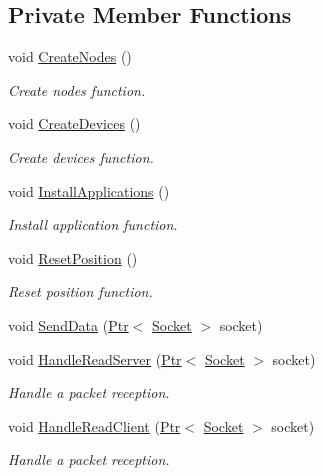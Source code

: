 \subsection*{Private Member Functions}
\begin{DoxyCompactItemize}
\item 
void \hyperlink{classHwmpReactiveRegressionTest_a8fc99893263e4df5158da499f1209832}{Create\+Nodes} ()
\begin{DoxyCompactList}\small\item\em Create nodes function. \end{DoxyCompactList}\item 
void \hyperlink{classHwmpReactiveRegressionTest_a8b288a6801baae1e65f87de7eb0352a4}{Create\+Devices} ()
\begin{DoxyCompactList}\small\item\em Create devices function. \end{DoxyCompactList}\item 
void \hyperlink{classHwmpReactiveRegressionTest_aff40d00524e84993b9cd2f391ae33a55}{Install\+Applications} ()
\begin{DoxyCompactList}\small\item\em Install application function. \end{DoxyCompactList}\item 
void \hyperlink{classHwmpReactiveRegressionTest_a4e90c3bf3be7eaf73a9b84d26d6ec0f3}{Reset\+Position} ()
\begin{DoxyCompactList}\small\item\em Reset position function. \end{DoxyCompactList}\item 
void \hyperlink{classHwmpReactiveRegressionTest_a592ecd22aea39386c4182533b83f1f10}{Send\+Data} (\hyperlink{classns3_1_1Ptr}{Ptr}$<$ \hyperlink{classns3_1_1Socket}{Socket} $>$ socket)
\item 
void \hyperlink{classHwmpReactiveRegressionTest_acc897ea0f9f7e19e7036f74b3c2b808b}{Handle\+Read\+Server} (\hyperlink{classns3_1_1Ptr}{Ptr}$<$ \hyperlink{classns3_1_1Socket}{Socket} $>$ socket)
\begin{DoxyCompactList}\small\item\em Handle a packet reception. \end{DoxyCompactList}\item 
void \hyperlink{classHwmpReactiveRegressionTest_af57f8aa49c77c1fa32e52fe8de6cc42b}{Handle\+Read\+Client} (\hyperlink{classns3_1_1Ptr}{Ptr}$<$ \hyperlink{classns3_1_1Socket}{Socket} $>$ socket)
\begin{DoxyCompactList}\small\item\em Handle a packet reception. \end{DoxyCompactList}\end{DoxyCompactItemize}
